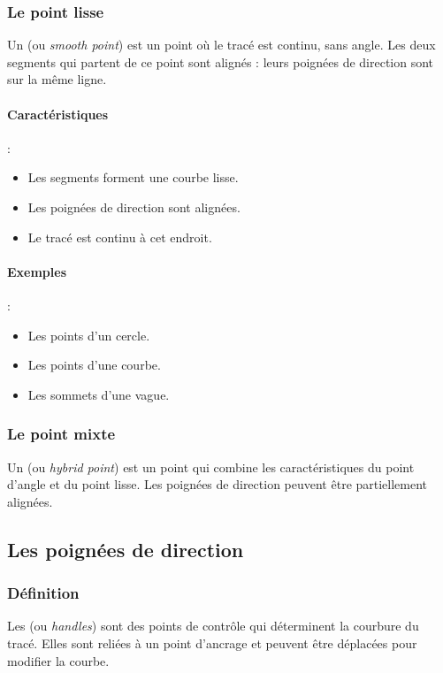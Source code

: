 \subsubsection{Le point lisse}

Un  (ou \emph{smooth point}) est un point où le tracé est continu, sans angle. Les deux segments qui partent de ce point sont alignés : leurs poignées de direction sont sur la même ligne.

\paragraph{Caractéristiques} :
\begin{itemize}
    \item Les segments forment une courbe lisse.
    \item Les poignées de direction sont alignées.
    \item Le tracé est continu à cet endroit.
\end{itemize}

\paragraph{Exemples} :
\begin{itemize}
    \item Les points d'un cercle.
    \item Les points d'une courbe.
    \item Les sommets d'une vague.
\end{itemize}

\subsubsection{Le point mixte}

Un  (ou \emph{hybrid point}) est un point qui combine les caractéristiques du point d'angle et du point lisse. Les poignées de direction peuvent être partiellement alignées.

\subsection{Les poignées de direction}

\subsubsection{Définition}

Les  (ou \emph{handles}) sont des points de contrôle qui déterminent la courbure du tracé. Elles sont reliées à un point d'ancrage et peuvent être déplacées pour modifier la courbe.

